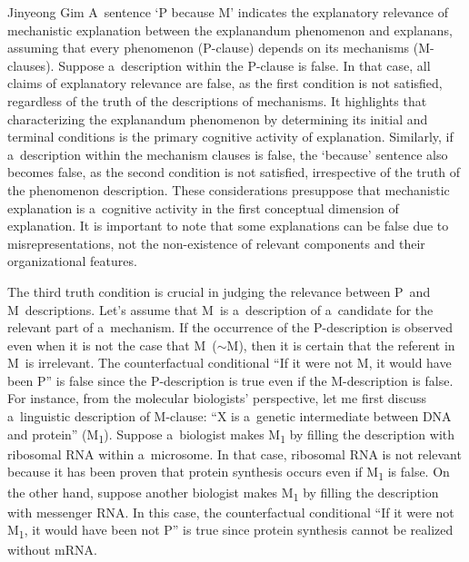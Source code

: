 \begin{artengenv}{Jinyeong Gim}
A~sentence ‘P because M' indicates the explanatory relevance of mechanistic explanation between the explanandum phenomenon and explanans, assuming that every phenomenon (P-clause) depends on its mechanisms (M-clauses). Suppose a~description within the P-clause is false. In that case, all claims of explanatory relevance are false, as the first condition is not satisfied, regardless of the truth of the descriptions of mechanisms. It highlights that characterizing the explanandum phenomenon by determining its initial and terminal conditions is the primary cognitive activity of explanation. Similarly, if a~description within the mechanism clauses is false, the ‘because' sentence also becomes false, as the second condition is not satisfied, irrespective of the truth of the phenomenon description. These considerations presuppose that mechanistic explanation is a~cognitive activity in the first conceptual dimension of explanation. It is important to note that some explanations can be false due to misrepresentations, not the non-existence of relevant components and their organizational features.

The third truth condition is crucial in judging the relevance between P~and M~descriptions. Let's assume that M~is a~description of a~candidate for the relevant part of a~mechanism. If the occurrence of the P-description is observed even when it is not the case that M~($\sim$M), then it is certain that the referent in M~is irrelevant. The counterfactual conditional ``If it were not M, it would have been P'' is false since the P-description is true even if the M-description is false. For instance, from the molecular biologists' perspective, let me first discuss a~linguistic description of M-clause: ``X is a~genetic intermediate between DNA and protein'' (M\textsubscript{1}). Suppose a~biologist makes M\textsubscript{1} by filling the description with ribosomal RNA within a~microsome. In that case, ribosomal RNA is not relevant because it has been proven that protein synthesis occurs even if M\textsubscript{1} is false. On the other hand, suppose another biologist makes M\textsubscript{1} by filling the description with messenger RNA. In this case, the counterfactual conditional ``If it were not M\textsubscript{1}, it would have been not P'' is true since protein synthesis cannot be realized without mRNA.


\end{artengenv}
